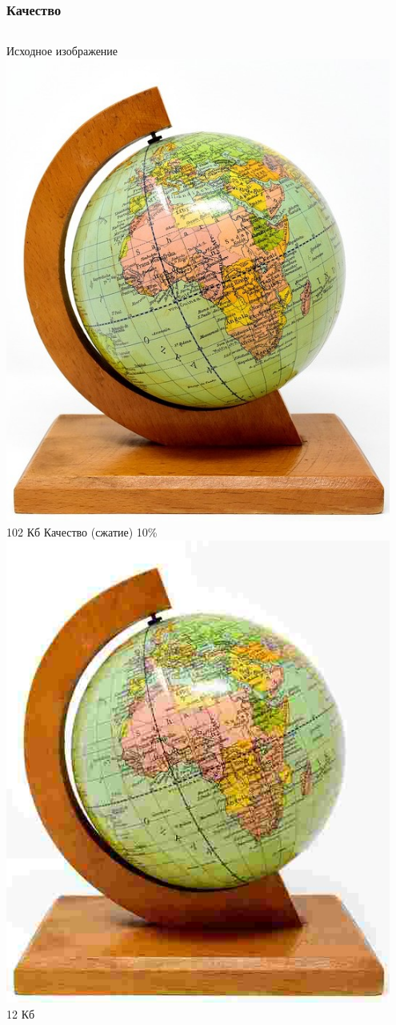 \documentclass[11pt, compress]{beamer}
\begin{document}
\begin{frame}[c]
\frametitle{Качество}
\begin{columns}
Исходное изображение
\includegraphics[width=0.95\textwidth]{globe.jpg}\\
102 Кб
Качество (сжатие) 10\%
\includegraphics[width=0.95\textwidth]{globe10.jpg}\\ 
12 Кб
\end{columns}  
\end{frame}
\end{document}
